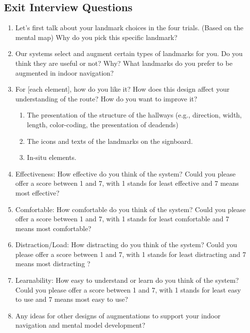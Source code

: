 \subsection{Exit Interview Questions}
\begin{enumerate}
 \item Let’s first talk about your landmark choices in the four trials. (Based on the mental map) Why do you pick this specific landmark?

 \item Our systems select and augment certain types of landmarks for you. Do you think they are useful or not? Why? What landmarks do you prefer to be augmented in indoor navigation? 

\item For [each element], how do you like it? How does this design affect your understanding of the route? How do you want to improve it?
\begin{enumerate}
\item The presentation of the structure of the hallways (e.g., direction, width, length, color-coding, the presentation of deadends)
\item The icons and texts of the landmarks on the signboard.
\item In-situ elements.
\end{enumerate}


\item Effectiveness: How effective do you think of the system? Could you please offer a score between 1 and 7, with 1 stands for least effective and 7 means most effective?
\item Comfortable: How comfortable do you think of the system? Could you please offer a score between 1 and 7, with 1 stands for least comfortable and 7 means most comfortable?

\item Distraction/Load: How distracting do you think of the system? Could you please offer a score between 1 and 7, with 1 stands for least distracting and 7 means most distracting ?
\item Learnability: How easy to understand or learn do you think of the system? Could you please offer a score between 1 and 7, with 1 stands for least easy to use and 7 means most easy to use?

\item Any ideas for other designs of augmentations to support your indoor navigation and mental model development?


\end{enumerate}

